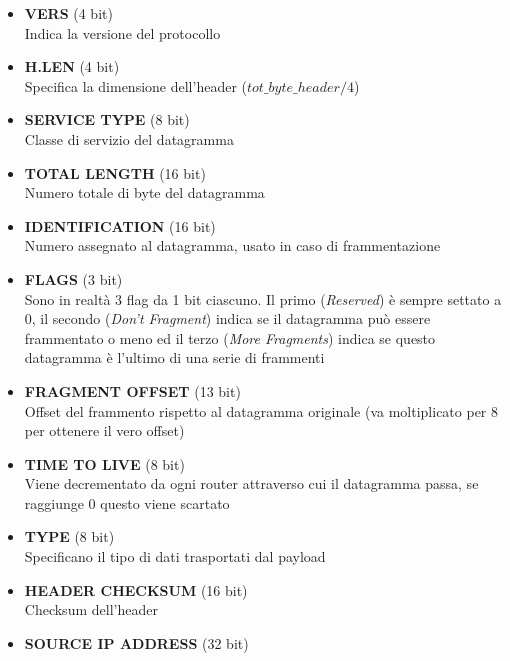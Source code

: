 \documentclass{article}
\begin{document}
                \begin{itemize}
                    \item \textbf{VERS} (4 bit)\\
                          Indica la versione del protocollo
                    \item \textbf{H.LEN} (4 bit)\\
                          Specifica la dimensione dell'header ($ tot\_byte\_header/4 $)
                    \item \textbf{SERVICE TYPE} (8 bit)\\
                          Classe di servizio del datagramma
                    \item \textbf{TOTAL LENGTH} (16 bit)\\
                          Numero totale di byte del datagramma
                    \item \textbf{IDENTIFICATION} (16 bit)\\
                          Numero assegnato al datagramma, usato in caso di frammentazione
                    \item \textbf{FLAGS} (3 bit)\\
                          Sono in realtà 3 flag da 1 bit ciascuno. Il primo (\textit{Reserved}) è sempre settato a 0, il secondo (\textit{Don't Fragment}) indica se il datagramma può essere frammentato o meno ed il terzo (\textit{More Fragments}) indica se questo datagramma è l'ultimo di una serie di frammenti
                    \item \textbf{FRAGMENT OFFSET} (13 bit)\\
                          Offset del frammento rispetto al datagramma originale (va moltiplicato per 8 per ottenere il vero offset)
                    \item \textbf{TIME TO LIVE} (8 bit)\\
                          Viene decrementato da ogni router attraverso cui il datagramma passa, se raggiunge 0 questo viene scartato
                    \item \textbf{TYPE} (8 bit)\\
                          Specificano il tipo di dati trasportati dal payload
                    \item \textbf{HEADER CHECKSUM} (16 bit)\\
                          Checksum dell'header
                    \item \textbf{SOURCE IP ADDRESS} (32 bit)\\

\end{itemize}
\end{document}
